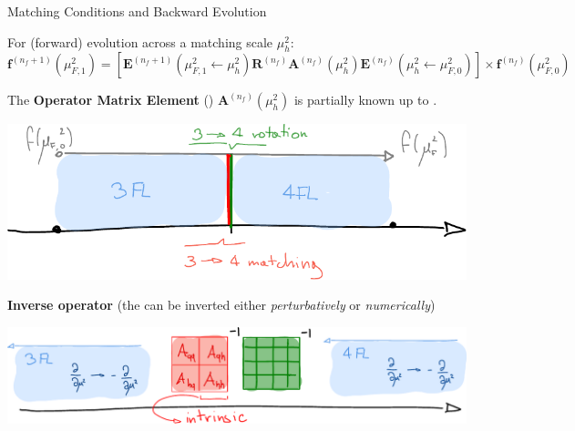 \documentclass[9pt]{beamer}
\begin{document}
\begin{frame}{Matching Conditions and Backward Evolution}
    \vspace*{10pt}

	For (forward) evolution across a matching scale $\mu_h^2$:
	\begin{equation*} 
        \mathbf{f}^{(n_f+1)}(\mu_{F,1}^2) =
        \left[\mathbf{E}^{(n_f+1)}(\mu_{F,1}^2\leftarrow \mu_{h}^2)
		{\mathbf{R}^{(n_f)}}
		\mathbf{A}^{(n_f)}(\mu_{h}^2)
        \mathbf{E}^{(n_f)}(\mu_{h}^2\leftarrow \mu_{F,0}^2) \right]
		\times \mathbf{f}^{(n_f)}(\mu_{F,0}^2)
	\end{equation*}
    \vspace*{5pt}

    The \textbf{Operator Matrix Element} (\ome) $\mathbf{A}^{(n_f)}(\mu_{h}^2)$
    is partially known up to \alert{\textbf{\nnnlo}}.

	\begin{center}
        \includegraphics[scale=.7]{vfns-details}
	\end{center}
    \vspace*{5pt}

    \alert{\textbf{Inverse operator}} (the \ome can be inverted either
    \textit{perturbatively} or \textit{numerically})
	\begin{center}
        \includegraphics[scale=.7]{vfns-back-details}
	\end{center}
\end{frame}
\end{document}
